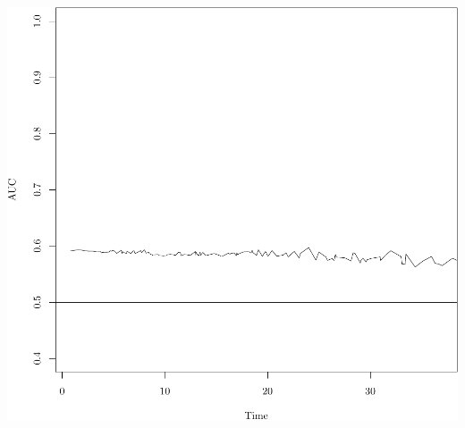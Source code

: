 \documentclass{article}\usepackage[]{graphicx}\usepackage[]{color}
\makeatletter
\def\maxwidth{ %
  \ifdim\Gin@nat@width>\linewidth
    \linewidth
  \else
    \Gin@nat@width
  \fi
}
\newenvironment{knitrout}{}{} %
\makeatother
\begin{document}
\begin{knitrout}
{\centering \includegraphics[width=\maxwidth]{figure/05-risksetROC-9} 

}



\end{knitrout}
\end{document}
